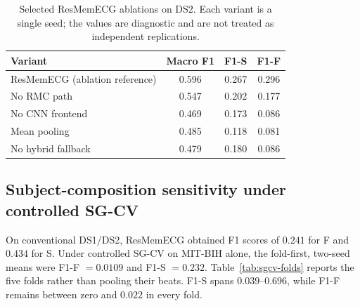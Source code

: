 \documentclass[review,12pt]{elsarticle}
\begin{document}
\begin{table}[htbp]
\caption{Selected ResMemECG ablations on DS2. Each variant is a single seed;
the values are diagnostic and are not treated as independent replications.}
\label{tab:resmemecg-ablation}
\centering
\begin{tabular}{@{}lccc@{}}
\toprule
Variant & Macro F1 & F1-S & F1-F \\
\midrule
ResMemECG (ablation reference) & 0.596 & 0.267 & 0.296 \\
No RMC path & 0.547 & 0.202 & 0.177 \\
No CNN frontend & 0.469 & 0.173 & 0.086 \\
Mean pooling & 0.485 & 0.118 & 0.081 \\
No hybrid fallback & 0.479 & 0.180 & 0.086 \\
\bottomrule
\end{tabular}
\end{table}

\subsection{Subject-composition sensitivity under controlled SG-CV}
On conventional DS1/DS2, ResMemECG obtained F1 scores of $0.241$ for F and
$0.434$ for S. Under controlled SG-CV on MIT-BIH alone, the fold-first, two-seed means
were F1-F $=0.0109$ and F1-S $=0.232$. Table~\ref{tab:sgcv-folds} reports the
five folds rather than pooling their beats. F1-S spans $0.039$--$0.696$, while
F1-F remains between zero and $0.022$ in every fold.

\begin{table}[htbp]
\caption{Controlled MIT-BIH-only SG-CV results. Values first average seeds 42
and 123 within each outer fold. Support is the number of true test beats; no
beat-pooled summary is used.}
\label{tab:sgcv-folds}
\centering
{}
\end{table}
\end{document}
